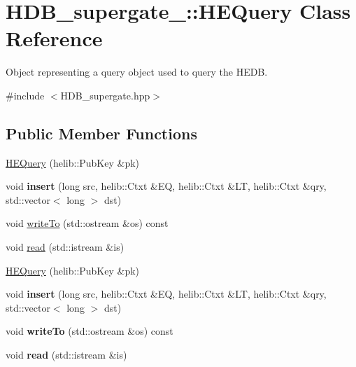 \hypertarget{classHDB__supergate___1_1HEQuery}{}\section{H\+D\+B\+\_\+supergate\+\_\+\+:\+:H\+E\+Query Class Reference}
\label{classHDB__supergate___1_1HEQuery}


Object representing a query object used to query the H\+E\+DB.  




{\ttfamily \#include $<$H\+D\+B\+\_\+supergate.\+hpp$>$}

\subsection*{Public Member Functions}
\begin{DoxyCompactItemize}
\item 
\hyperlink{classHDB__supergate___1_1HEQuery_aa860d9296f75ed1c4c39e81564108f18}{H\+E\+Query} (helib\+::\+Pub\+Key \&pk)
\item 
\mbox{\label{classHDB__supergate___1_1HEQuery_a593fd6ab75058588ed2c2124b2614959}} 
void {\bfseries insert} (long src, helib\+::\+Ctxt \&EQ, helib\+::\+Ctxt \&LT, helib\+::\+Ctxt \&qry, std\+::vector$<$ long $>$ dst)
\item 
void \hyperlink{classHDB__supergate___1_1HEQuery_a0270625cebd3b53388242368593e3587}{write\+To} (std\+::ostream \&os) const
\item 
void \hyperlink{classHDB__supergate___1_1HEQuery_a6f143e5569cf9edd5f16fb3042c955a1}{read} (std\+::istream \&is)
\item 
\hyperlink{classHDB__supergate___1_1HEQuery_aa860d9296f75ed1c4c39e81564108f18}{H\+E\+Query} (helib\+::\+Pub\+Key \&pk)
\item 
\mbox{\label{classHDB__supergate___1_1HEQuery_a593fd6ab75058588ed2c2124b2614959}} 
void {\bfseries insert} (long src, helib\+::\+Ctxt \&EQ, helib\+::\+Ctxt \&LT, helib\+::\+Ctxt \&qry, std\+::vector$<$ long $>$ dst)
\item 
\mbox{\label{classHDB__supergate___1_1HEQuery_a0270625cebd3b53388242368593e3587}} 
void {\bfseries write\+To} (std\+::ostream \&os) const
\item 
\mbox{\label{classHDB__supergate___1_1HEQuery_a6f143e5569cf9edd5f16fb3042c955a1}} 
void {\bfseries read} (std\+::istream \&is)
\end{DoxyCompactItemize}
